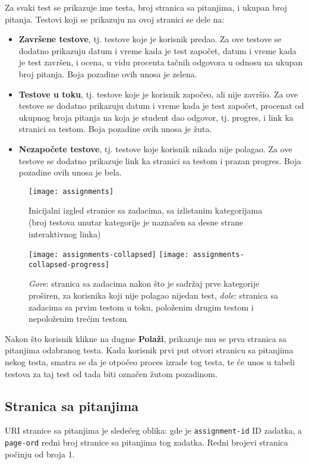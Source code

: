 Za svaki test se prikazuje ime testa, broj stranica sa pitanjima, i ukupan broj pitanja. Testovi koji se prikazuju na ovoj stranici se dele na:
\begin{itemize}
\renewcommand\labelitemi{--}
\item \textbf{Završene testove}, tj. testove koje je korisnik predao. Za ove testove se dodatno prikazuju datum i vreme kada je test započet, datum i vreme kada je test završen, i ocena, u vidu procenta tačnih odgovora u odnosu na ukupan broj pitanja. Boja pozadine ovih unosa je zelena.
\item \textbf{Testove u toku}, tj. testove koje je korisnik započeo, ali nije završio. Za ove testove se dodatno prikazuju datum i vreme kada je test započet, procenat od ukupnog broja pitanja na koja je student dao odgovor, tj. progres, i link ka stranici sa testom. Boja pozadine ovih unosa je žuta.
\item \textbf{Nezapočete testove}, tj. testove koje korisnik nikada nije polagao. Za ove testove se dodatno prikazuje link ka stranici sa testom i prazan progres. Boja pozadine ovih unosa je bela.
\end{itemize}
\begin{figure}[p]
\texttt{[image: assignments]}
\caption{Inicijalni izgled stranice sa zadacima, sa izlistanim kategorijama (broj testova unutar kategorije je naznačen sa desne strane interaktivnog linka)}
\label{fig:assignments}
\end{figure}
\begin{figure}[p]
\texttt{[image: assignments-collapsed]}
\texttt{[image: assignments-collapsed-progress]}
\caption{\textit{Gore}: stranica sa zadacima nakon što je sadržaj prve kategorije proširen, za korisnika koji nije polagao nijedan test, \textit{dole}: stranica sa zadacima sa prvim testom u toku, položenim drugim testom i nepoloženim trećim testom}
\label{fig:assignments-collapsed}
\end{figure}

Nakon što korisnik klikne na dugme \textbf{Polaži}, prikazuje mu se prva stranica sa pitanjima odabranog testa. Kada korisnik prvi put otvori stranicu sa pitanjima nekog testa, smatra se da je otpočeo proces izrade tog testa, te će unos u tabeli testova za taj test od tada biti označen žutom pozadinom.

\subsection{Stranica sa pitanjima}
URI stranice sa pitanjima je sledećeg oblika:  gde je \texttt{assignment-id} ID zadatka, a \texttt{page-ord} redni broj stranice sa pitanjima tog zadatka. Redni brojevi stranica počinju od broja 1.

